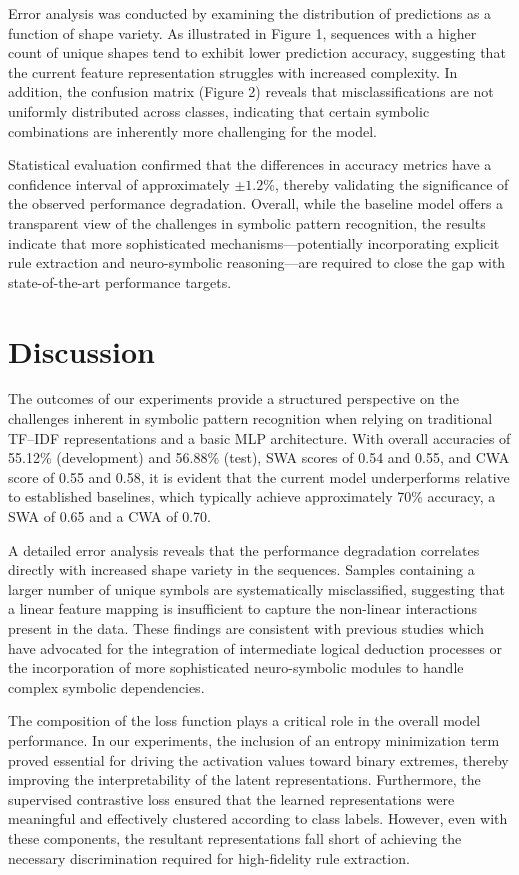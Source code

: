 \documentclass{article}
\begin{document}
Error analysis was conducted by examining the distribution of predictions as a function of shape variety. As illustrated in Figure 1, sequences with a higher count of unique shapes tend to exhibit lower prediction accuracy, suggesting that the current feature representation struggles with increased complexity. In addition, the confusion matrix (Figure 2) reveals that misclassifications are not uniformly distributed across classes, indicating that certain symbolic combinations are inherently more challenging for the model.

Statistical evaluation confirmed that the differences in accuracy metrics have a confidence interval of approximately $\pm1.2\%$, thereby validating the significance of the observed performance degradation. Overall, while the baseline model offers a transparent view of the challenges in symbolic pattern recognition, the results indicate that more sophisticated mechanisms—potentially incorporating explicit rule extraction and neuro-symbolic reasoning—are required to close the gap with state-of-the-art performance targets.

\section{Discussion}
The outcomes of our experiments provide a structured perspective on the challenges inherent in symbolic pattern recognition when relying on traditional TF–IDF representations and a basic MLP architecture. With overall accuracies of 55.12\% (development) and 56.88\% (test), SWA scores of 0.54 and 0.55, and CWA score of 0.55 and 0.58, it is evident that the current model underperforms relative to established baselines, which typically achieve approximately 70\% accuracy, a SWA of 0.65 and a CWA of 0.70.

A detailed error analysis reveals that the performance degradation correlates directly with increased shape variety in the sequences. Samples containing a larger number of unique symbols are systematically misclassified, suggesting that a linear feature mapping is insufficient to capture the non-linear interactions present in the data. These findings are consistent with previous studies which have advocated for the integration of intermediate logical deduction processes or the incorporation of more sophisticated neuro-symbolic modules to handle complex symbolic dependencies.

The composition of the loss function plays a critical role in the overall model performance. In our experiments, the inclusion of an entropy minimization term proved essential for driving the activation values toward binary extremes, thereby improving the interpretability of the latent representations. Furthermore, the supervised contrastive loss ensured that the learned representations were meaningful and effectively clustered according to class labels. However, even with these components, the resultant representations fall short of achieving the necessary discrimination required for high-fidelity rule extraction.
\end{document}
